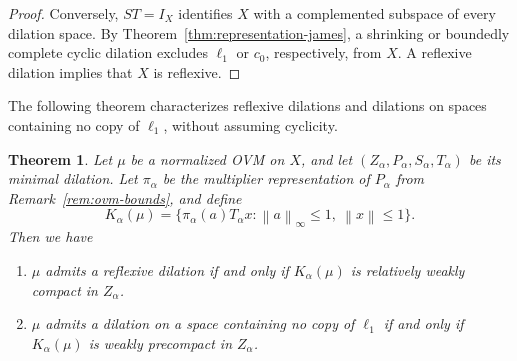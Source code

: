 \documentclass[11pt,leqno]{amsart}
\theoremstyle{compact}
\numberwithin{equation}{section}
\newtheorem{theorem}{Theorem}[section]
\theoremstyle{compactremark}
\theoremstyle{compact}
\newcommand{\1}{\mathbbm{1}}
\newcommand{\norm}[1]{\left\|#1\right\|}
\begin{document}
\begin{proof}
Conversely, $ST=I_X$ identifies $X$ with a complemented subspace of every dilation space. By Theorem~\ref{thm:representation-james}, a shrinking or boundedly complete cyclic dilation excludes $\ell_1$ or $c_0$, respectively, from $X$. A reflexive dilation implies that $X$ is reflexive.
\end{proof}

\begingroup
The following theorem characterizes reflexive dilations and dilations on spaces containing no copy of $\ell_1$, without assuming cyclicity.

\begin{theorem}\label{prop:multiplier-orbit-criterion}
Let $\mu$ be a normalized OVM on $X$, and let $(Z_\alpha,P_\alpha,S_\alpha,T_\alpha)$ be its minimal dilation. Let $\pi_\alpha$ be the multiplier representation of $P_\alpha$ from Remark~\ref{rem:ovm-bounds}, and define
\[
K_\alpha(\mu)=\{\pi_\alpha(a)T_\alpha x:\norm{a}_\infty\leq1,\ \norm{x}\leq1\}.
\]
Then we have
\begin{enumerate}
\item $\mu$ admits a reflexive dilation if and only if $K_\alpha(\mu)$ is relatively weakly compact in $Z_\alpha$.
\item $\mu$ admits a dilation on a space containing no copy of $\ell_1$ if and only if $K_\alpha(\mu)$ is weakly precompact in $Z_\alpha$.
\end{enumerate}
\end{theorem}
\end{document}
